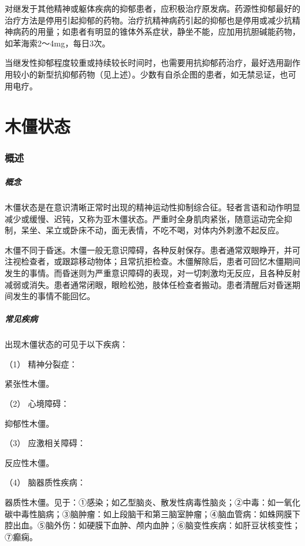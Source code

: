 对继发于其他精神或躯体疾病的抑郁患者，应积极治疗原发病。药源性抑郁最好的治疗方法是停用引起抑郁的药物。治疗抗精神病药引起的抑郁也是停用或减少抗精神病药的用量；如患者有明显的锥体外系症状，静坐不能，应加用抗胆碱能药物，如苯海索2～4mg，每日3次。

当继发性抑郁程度较重或持续较长时间时，也需要用抗抑郁药治疗，最好选用副作用较小的新型抗抑郁药物（见上述）。少数有自杀企图的患者，如无禁忌证，也可用电疗。

\protect\hypertarget{text00046.html}{}{}

\section{木僵状态}

\subsubsection{概述}

\subparagraph{概念}

木僵状态是在意识清晰正常时出现的精神运动性抑制综合征。轻者言语和动作明显减少或缓慢、迟钝，又称为亚木僵状态。严重时全身肌肉紧张，随意运动完全抑制，呆坐、呆立或卧床不动，面无表情，不吃不喝，对体内外刺激不起反应。

木僵不同于昏迷。木僵一般无意识障碍，各种反射保存。患者通常双眼睁开，并可注视检查者，或跟踪移动物体；且常抗拒检查。木僵解除后，患者可回忆木僵期间发生的事情。而昏迷则为严重意识障碍的表现，对一切刺激均无反应，且各种反射减弱或消失。患者通常闭眼，眼睑松弛，肢体任检查者搬动。患者清醒后对昏迷期间发生的事情不能回忆。

\subparagraph{常见疾病}

出现木僵状态的可见于以下疾病：

\hypertarget{text00046.htmlux5cux23CHP1-18-4-1-2-1}{}
（1） 精神分裂症：

紧张性木僵。

\hypertarget{text00046.htmlux5cux23CHP1-18-4-1-2-2}{}
（2） 心境障碍：

抑郁性木僵。

\hypertarget{text00046.htmlux5cux23CHP1-18-4-1-2-3}{}
（3） 应激相关障碍：

反应性木僵。

\hypertarget{text00046.htmlux5cux23CHP1-18-4-1-2-4}{}
（4） 脑器质性疾病：

器质性木僵。见于：①感染；如乙型脑炎、散发性病毒性脑炎；②中毒：如一氧化碳中毒性脑病；③脑肿瘤：如上段脑干和第三脑室肿瘤；④脑血管病：如蛛网膜下腔出血。⑤脑外伤：如硬膜下血肿、颅内血肿；⑥脑变性疾病：如肝豆状核变性；⑦癫痫。

